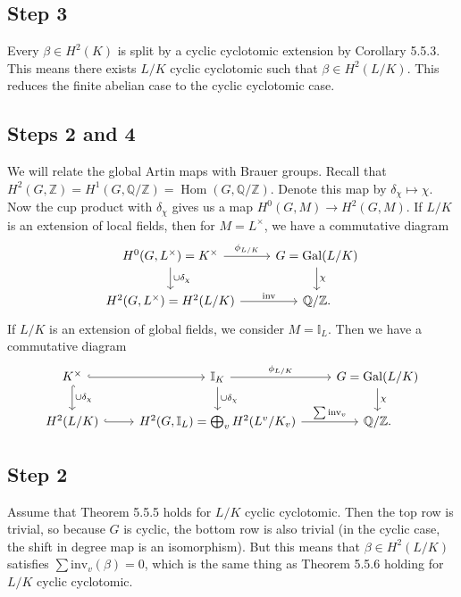 \documentclass[leqno, openany]{memoir}
\theoremstyle{definition}
\theoremstyle{remark}
\theoremstyle{plain}
\theoremstyle{definition}
\theoremstyle{remark}
\newcommand{\Z}{\mathbb{Z}}
\newcommand{\Q}{\mathbb{Q}}
\newcommand{\I}{\mathbb{I}}
\newcommand{\mr}[1]{\mathrm{#1}}
\DeclareMathOperator{\Hom}{Hom}
\DeclareMathOperator{\Gal}{Gal}
\begin{document}
\subsection{Step 3}%

Every $\beta \in H^2(K)$ is split by a cyclic cyclotomic extension by Corollary
5.5.3. This means there exists $L/K$ cyclic cyclotomic such that $\beta \in
H^2(L/K)$. This reduces the finite abelian case to the cyclic cyclotomic case.

\subsection{Steps 2 and 4}%

We will relate the global Artin maps with Brauer groups. Recall that $H^2(G,
\Z) = H^1(G, \Q/\Z) = \Hom(G, \Q/\Z)$. Denote this map by $\delta_{\chi}
\mapsto \chi$. Now the cup product with $\delta_{\chi}$ gives us a map $H^0(G,
M) \to H^2(G, M)$. If $L/K$ is an extension of local fields, then for $M =
L^{\times}$, we have a commutative diagram \begin{equation*} \begin{tikzcd}
    H^0(G, L^{\times}) = K^{\times} \ar{r}{\phi_{L/K}} \ar{d}{\cup
    \delta_{\chi}} & G = \Gal(L/K) \ar{d}{\chi} \\ H^2(G, L^{\times}) =
    H^2(L/K) \ar{r}{\mr{inv}} & \Q/\Z.  \end{tikzcd} \end{equation*} If $L/K$
            is an extension of global fields, we consider $M = \I_L$. Then we
            have a commutative diagram \begin{equation} \begin{tikzcd}
                K^{\times} \ar[hookrightarrow]{d}{\cup \delta_{\chi}}
                \ar[hookrightarrow]{r} & \I_K \ar{r}{\phi_{L/K}} \ar{d}{\cup
                \delta_{\chi}} & G = \Gal(L/K) \ar{d}{\chi} \\ H^2(L/K)
            \ar[hookrightarrow]{r} & H^2(G, \I_L) = \bigoplus_v H^2(L^v/K_v)
        \ar{r}{\sum \mr{inv}_v} & \Q/\Z.  \end{tikzcd} \end{equation}

\subsection{Step 2}%

Assume that Theorem 5.5.5 holds for $L/K$ cyclic cyclotomic. Then the top row
is trivial, so because $G$ is cyclic, the bottom row is also trivial (in the
cyclic case, the shift in degree map is an isomorphism). But this means that
$\beta \in H^2(L/K)$ satisfies $\sum \mr{inv}_v(\beta) = 0$, which is the same
thing as Theorem 5.5.6 holding for $L/K$ cyclic cyclotomic.
\end{document}
